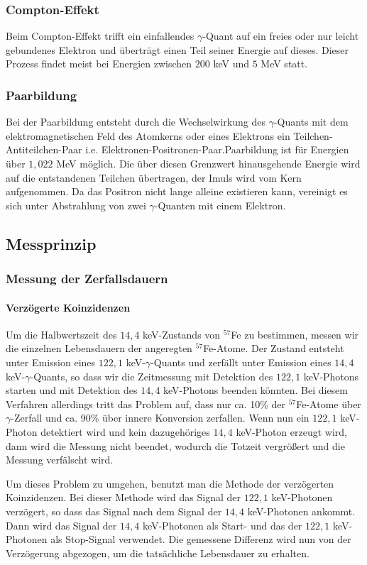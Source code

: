 \documentclass[12pt]{article}
\begin{document}
 \subsubsection{Compton-Effekt}
 Beim Compton-Effekt trifft ein einfallendes $\gamma$-Quant auf ein freies oder nur leicht gebundenes Elektron und überträgt einen Teil seiner Energie auf dieses. Dieser Prozess findet meist bei Energien zwischen $200$ keV und $5$ MeV statt.
 \subsubsection{Paarbildung}
 Bei der Paarbildung entsteht durch die Wechselwirkung des $\gamma$-Quants mit dem elektromagnetischen Feld des Atomkerns oder eines Elektrons ein Teilchen-Antiteilchen-Paar i.e. Elektronen-Positronen-Paar.Paarbildung ist für Energien über $1,022$ MeV möglich. Die über diesen Grenzwert hinausgehende Energie wird auf die entstandenen Teilchen übertragen, der Imuls wird vom Kern aufgenommen. Da das Positron nicht lange alleine existieren kann, vereinigt es sich unter Abstrahlung von zwei $\gamma$-Quanten mit einem Elektron.
 \subsection{Messprinzip}
 \subsubsection{Messung der Zerfallsdauern}
 
 \paragraph{Verzögerte Koinzidenzen}Um die Halbwertszeit des $14,4$ keV-Zustands von $^{57}$Fe zu bestimmen, messen wir die einzelnen Lebensdauern der angeregten $^{57}$Fe-Atome. Der Zustand entsteht unter Emission eines $122,1$ keV-$\gamma$-Quants und zerfällt unter Emission eines $14,4$ keV-$\gamma$-Quants, so dass wir die Zeitmessung mit Detektion des $122,1$ keV-Photons starten und mit Detektion des $14,4$ keV-Photons beenden könnten. Bei diesem Verfahren allerdings tritt das Problem auf, dass nur ca. 10\% der $^{57}$Fe-Atome über $\gamma$-Zerfall und ca. 90\% über innere Konversion zerfallen. Wenn nun ein $122,1$ keV-Photon detektiert wird und kein dazugehöriges $14,4$ keV-Photon erzeugt wird, dann wird die Messung nicht beendet, wodurch die Totzeit vergrößert und die Messung verfälscht wird. 
 
 Um dieses Problem zu umgehen, benutzt man die Methode der verzögerten Koinzidenzen. Bei dieser Methode wird das Signal der $122,1$ keV-Photonen verzögert, so dass das Signal nach dem Signal der $14,4$ keV-Photonen ankommt. Dann wird das Signal der $14,4$ keV-Photonen als Start- und das der $122,1$ keV-Photonen als Stop-Signal verwendet. Die gemessene Differenz wird nun von der Verzögerung abgezogen, um die tatsächliche Lebensdauer zu erhalten.
 
\end{document}
